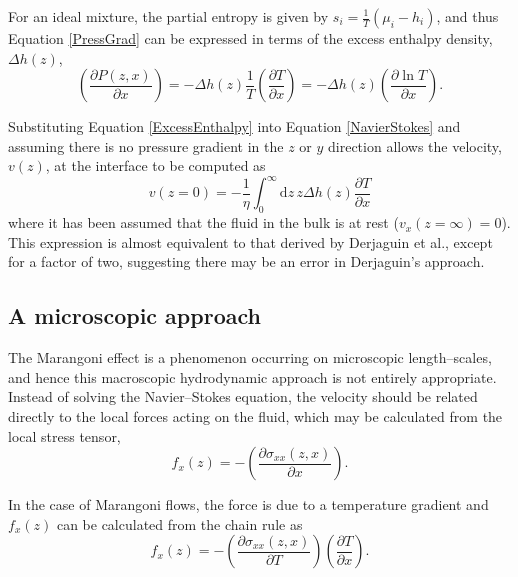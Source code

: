 For an ideal mixture, the partial entropy is given by $s_{i}=\frac{1}{T} \left(\mu_{i}-h_{i} \right)$, and thus Equation \ref{PressGrad} can be expressed in terms of the excess enthalpy density, $\Delta h(z)$,
\begin{equation}
\label{ExcessEnthalpy}
\left(\frac{\partial P(z,x)}{\partial x}\right)= - \Delta h(z)\frac{1}{T} \left( \frac{\partial T}{\partial x} \right) 
= - \Delta h(z) \left( \frac{\partial \ln T}{\partial x} \right).
\end{equation}

Substituting Equation \ref{ExcessEnthalpy} into Equation \ref{NavierStokes} and assuming there is no pressure gradient in the $z$ or $y$ direction allows the velocity, $v(z)$, at the interface to be computed as
\begin{equation}
\label{DoubleIntegral}
v (z=0) = - \frac{1}{\eta}\int_{0}^{\infty} \mathrm{d}z\, z \Delta h(z) \frac{\partial T}{\partial x}
\end{equation}
where it has been assumed that the fluid in the bulk is at rest ($v_{x}(z=\infty)=0$).
This expression is almost equivalent to that derived by Derjaguin et al., except for a factor of two, suggesting there may be an error in Derjaguin's approach.\cite{SurfaceForces, Anderson}

\subsection{A microscopic approach}
The Marangoni effect is a phenomenon occurring on microscopic length--scales, and hence this macroscopic hydrodynamic approach is not entirely appropriate.
Instead of solving the Navier--Stokes equation, the velocity should be related directly to the local forces acting on the fluid, which may be calculated from the local stress tensor,
\begin{equation}
\label{ForceStress}
f_{x}(z) = - \left( \frac{\partial \sigma_{xx}(z,x)}{\partial x} \right).
\end{equation}

In the case of Marangoni flows, the force is due to a temperature gradient and $f_{x}(z)$ can be calculated from the chain rule as
\begin{equation}
\label{ForceStressTemp}
f_{x}(z) = - \left( \frac{\partial \sigma_{xx}(z,x)}{\partial T} \right) \left( \frac{\partial T}{\partial x} \right).
\end{equation}

